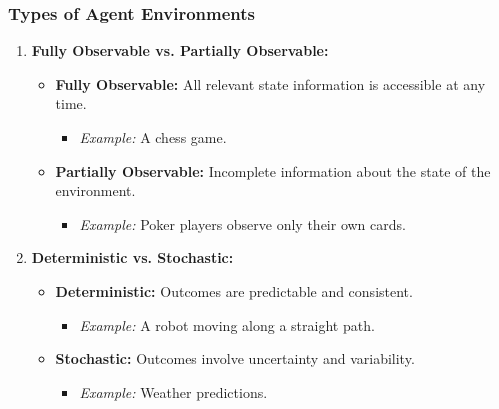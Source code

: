 \documentclass[aspectratio=169]{beamer}
\begin{document}
\begin{frame}[fragile]
    \frametitle{Types of Agent Environments}
    \begin{enumerate}
        \item \textbf{Fully Observable vs. Partially Observable:}
            \begin{itemize}
                \item \textbf{Fully Observable:} All relevant state information is accessible at any time.
                      \begin{itemize}
                          \item \textit{Example:} A chess game.
                      \end{itemize}
                \item \textbf{Partially Observable:} Incomplete information about the state of the environment.
                      \begin{itemize}
                          \item \textit{Example:} Poker players observe only their own cards.
                      \end{itemize}
            \end{itemize}
        
        \item \textbf{Deterministic vs. Stochastic:}
            \begin{itemize}
                \item \textbf{Deterministic:} Outcomes are predictable and consistent.
                      \begin{itemize}
                          \item \textit{Example:} A robot moving along a straight path.
                      \end{itemize}
                \item \textbf{Stochastic:} Outcomes involve uncertainty and variability.
                      \begin{itemize}
                          \item \textit{Example:} Weather predictions.
                      \end{itemize}
            \end{itemize}
        

\end{enumerate}
\end{frame}
\end{document}
